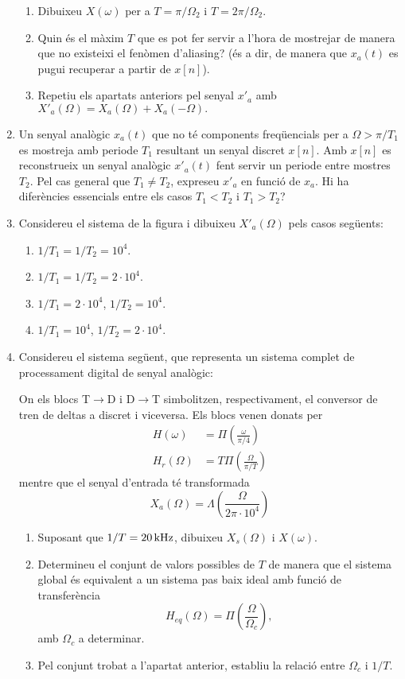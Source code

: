 \documentclass[a4paper,12pt]{article}
\def\figura#1{\begin{figure}[htbp]\centering\end{figure}\par}
\begin{document}
\begin{enumerate}
\begin{enumerate}
  \item Dibuixeu $X(\omega)$ per a $T=\pi/\Omega_2$ i $T=2\pi/\Omega_2$.
  \item Quin és el màxim $T$ que es pot fer servir a l'hora de
    mostrejar de manera que no existeixi el fenòmen d'aliasing? (és a
    dir, de manera que $x_a(t)$ es pugui recuperar a partir de
    $x[n]$).
  \item Repetiu els apartats anteriors pel senyal $x'_a$ amb
    $X'_a(\Omega)=X_a(\Omega)+X_a(-\Omega).$
  \end{enumerate}
\item Un senyal analògic $x_a(t)$ que no té components freqüencials per a
  $\Omega>\pi/T_1$ es mostreja amb periode $T_1$ resultant un senyal
  discret $x[n]$. Amb $x[n]$ es reconstrueix un senyal analògic
  $x'_a(t)$ fent
  servir un periode 
  entre mostres $T_2$. Pel cas general que $T_1\neq T_2$, expreseu
  $x'_a$ en funció de $x_a$. Hi ha diferències essencials entre els
  casos $T_1<T_2$ i $T_1>T_2$?
\item Considereu el sistema de la figura i
  dibuixeu $X'_a(\Omega)$ pels casos següents:
  \begin{enumerate}
  \item $1/T_1=1/T_2=10^4$.
  \item $1/T_1=1/T_2=2\cdot10^4$.
  \item $1/T_1=2\cdot10^4$, $1/T_2=10^4$.
  \item $1/T_1=10^4$, $1/T_2=2\cdot10^4$.
  \end{enumerate}
  \figura{probl3.exc6.pstex_t}
\item Considereu el sistema següent, que representa un sistema complet
  de processament digital de senyal analògic:
  \figura{probl3.exc7.pstex_t}
  On els blocs T$\to$D i D$\to$T simbolitzen, respectivament, el
  conversor de tren de deltas a discret i viceversa. Els blocs
  venen donats per
  \begin{align*}
    H(\omega)&=\Pi\left(\frac\omega{\pi/4}\right)\\
    H_r(\Omega)&=T\Pi\left(\frac\Omega{\pi/T}\right)
  \end{align*}
  mentre que el senyal d'entrada té transformada
  $$X_a(\Omega)=\Lambda\left(\frac\Omega{2\pi\cdot10^4}\right)$$
  \begin{enumerate}
  \item Suposant que $1/T=20\,\rm{kHz}$, dibuixeu $X_s(\Omega)$ i
    $X(\omega)$. 
  \item Determineu el conjunt de valors possibles de $T$ de manera que
    el sistema global és equivalent a un sistema pas baix ideal amb
    funció de transferència
    $$H_{eq}(\Omega)=\Pi\left(\frac\Omega{\Omega_c}\right),$$
    amb $\Omega_c$ a determinar.
  \item Pel conjunt trobat a l'apartat anterior, establiu la relació
    entre $\Omega_c$  i $1/T$.
  \end{enumerate}
  

\end{enumerate}
\end{document}
